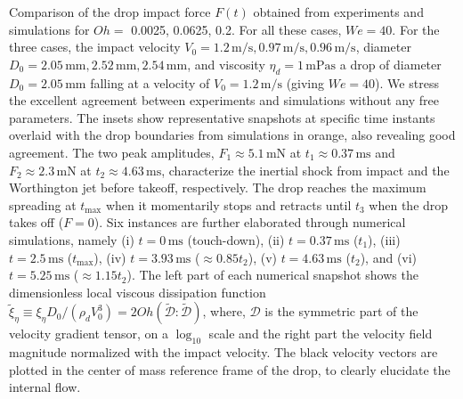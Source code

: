 \documentclass[]{article}
\begin{document}
Comparison of the drop impact force $F(t)$ obtained from experiments and simulations for $Oh = $ 0.0025, 0.0625, 0.2.  For all these cases, $We = 40$. For the three cases, the impact velocity $V_0 = 1.2\,\si{\meter}/\si{\second}, 0.97\,\si{\meter}/\si{\second}, 0.96\,\si{\meter}/\si{\second}$, diameter $D_0 = 2.05\,\si{\milli\meter}, 2.52\,\si{\milli\meter}, 2.54\,\si{\milli\meter}$, and viscosity $\eta_d = 1\,\si{\milli\pascal\second}$ a drop of diameter $D_0 = 2.05\,\si{\milli\meter}$ falling at a velocity of $V_0 = 1.2\,\si{\meter}/\si{\second}$ (giving $We = 40$). We stress the excellent agreement between experiments and simulations without any free parameters. The insets show representative snapshots at specific time instants overlaid with the drop boundaries from simulations in orange, also revealing good agreement. The two peak amplitudes, $F_1 \approx 5.1\,\si{\milli\newton}$ at $t_1 \approx 0.37\,\si{\milli\second}$ and $F_2 \approx 2.3\,\si{\milli\newton}$ at $t_2 \approx 4.63\,\si{\milli\second}$, characterize the inertial shock from impact and the Worthington jet before takeoff, respectively. The drop reaches the maximum spreading at $t_{\text{max}}$ when it momentarily stops and retracts until $t_3$ when the drop takes off ($F = 0$). Six instances are further elaborated through numerical simulations, namely (i) $t = 0\,\si{\milli\second}$ (touch-down), (ii) $t = 0.37\,\si{\milli\second}$ ($t_1$), (iii) $t = 2.5\,\si{\milli\second}$ ($t_{\text{max}}$), (iv) $t = 3.93\,\si{\milli\second}$ ($\approx 0.85t_2$), (v) $t = 4.63\,\si{\milli\second}$ ($t_2$), and (vi) $t = 5.25\,\si{\milli\second}$ ($\approx 1.15t_2$). The left part of each numerical snapshot shows the dimensionless local viscous dissipation function $\tilde{\xi}_\eta \equiv \xi_\eta D_0/\left(\rho_dV_0^3\right) = 2Oh\left(\boldsymbol{\tilde{\mathcal{D}}:\tilde{\mathcal{D}}}\right)$, where, $\boldsymbol{\mathcal{D}}$ is the symmetric part of the velocity gradient tensor, on a $\log_{10}$ scale and the right part the velocity field magnitude normalized with the impact velocity. The black velocity vectors are plotted in the center of mass reference frame of the drop, to clearly elucidate the internal flow.
\end{document}
